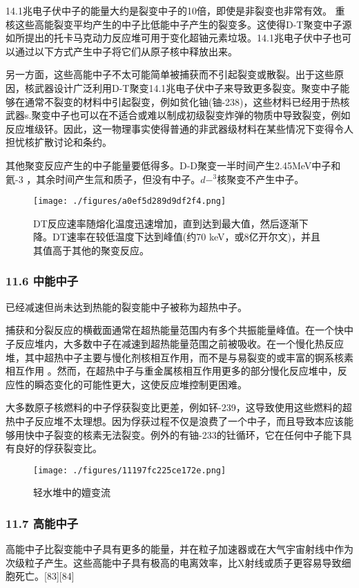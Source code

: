 14.1兆电子伏中子的能量大约是裂变中子的10倍，即使是非裂变也非常有效。 重核这些高能裂变平均产生的中子比低能中子产生的裂变多。这使得D-T聚变中子源如所提出的托卡马克动力反应堆可用于变化超铀元素垃圾。14.1兆电子伏中子也可以通过以下方式产生中子将它们从原子核中释放出来。

另一方面，这些高能中子不太可能简单被捕获而不引起裂变或散裂。出于这些原因，核武器设计广泛利用D-T聚变14.1兆电子伏中子来导致更多裂变。聚变中子能够在通常不裂变的材料中引起裂变，例如贫化铀(铀-238)，这些材料已经用于热核武器s.聚变中子也可以在不适合或难以制成初级裂变炸弹的物质中导致裂变，例如反应堆级钚。因此，这一物理事实使得普通的非武器级材料在某些情况下变得令人担忧核扩散讨论和条约。

其他聚变反应产生的中子能量要低得多。D-D聚变一半时间产生2.45MeV中子和氦-3 ，其余时间产生氚和质子，但没有中子。$d-^{3}$核聚变不产生中子。
\begin{figure}[ht]
\centering
\texttt{[image: ./figures/a0ef5d289d9df2f4.png]}
\caption{DT反应速率随熔化温度迅速增加，直到达到最大值，然后逐渐下降。DT速率在较低温度下达到峰值(约70 keV，或8亿开尔文)，并且其值高于其他的聚变反应。} \label{fig_Neutro_8}
\end{figure}

\subsubsection{11.6 中能中子}
已经减速但尚未达到热能的裂变能中子被称为超热中子。

捕获和分裂反应的横截面通常在超热能量范围内有多个共振能量峰值。在一个快中子反应堆内，大多数中子在减速到超热能量范围之前被吸收。在一个慢化热反应堆，其中超热中子主要与慢化剂核相互作用，而不是与易裂变的或丰富的锕系核素相互作用 。然而，在超热中子与重金属核相互作用更多的部分慢化反应堆中，反应性的瞬态变化的可能性更大，这使反应堆控制更困难。

大多数原子核燃料的中子俘获裂变比更差，例如钚-239，这导致使用这些燃料的超热中子反应堆不太理想。因为俘获过程不仅是浪费了一个中子，而且导致本应该能够用快中子裂变的核素无法裂变。例外的有铀-233的钍循环，它在任何中子能下具有良好的俘获裂变比。
\begin{figure}[ht]
\centering
\texttt{[image: ./figures/11197fc225ce172e.png]}
\caption{轻水堆中的嬗变流} \label{fig_Neutro_9}
\end{figure}

\subsubsection{11.7 高能中子}
高能中子比裂变能中子具有更多的能量，并在粒子加速器或在大气宇宙射线中作为次级粒子产生。这些高能中子具有极高的电离效率，比X射线或质子更容易导致细胞死亡。[83][84]

